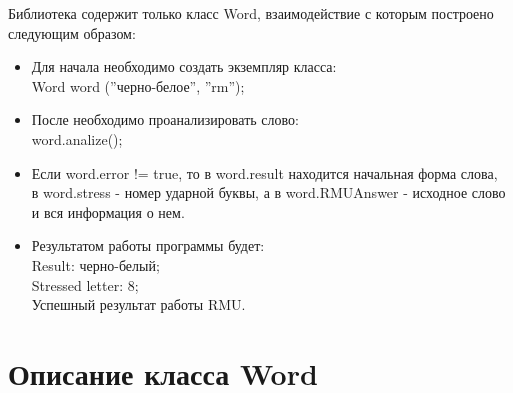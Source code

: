 \noindent Библиотека содержит только класс Word, взаимодействие с которым построено следующим образом:
\begin{itemize}
  \item Для начала необходимо создать экземпляр класса: \\
    Word word (''черно-белое'', ''rm'');
  \item После необходимо проанализировать слово: \\
    word.analize();
  \item Если word.error != true, то в word.result находится начальная форма слова, \\
  в word.stress - номер ударной буквы, а в word.RMUAnswer - исходное слово и вся информация о нем.
  \item Результатом работы программы будет: \\
    Result: черно-белый; \\
    Stressed letter: 8; \\
    Успешный результат работы RMU. 

\end{itemize}

\section{Описание класса Word} \label{sect4_3}

